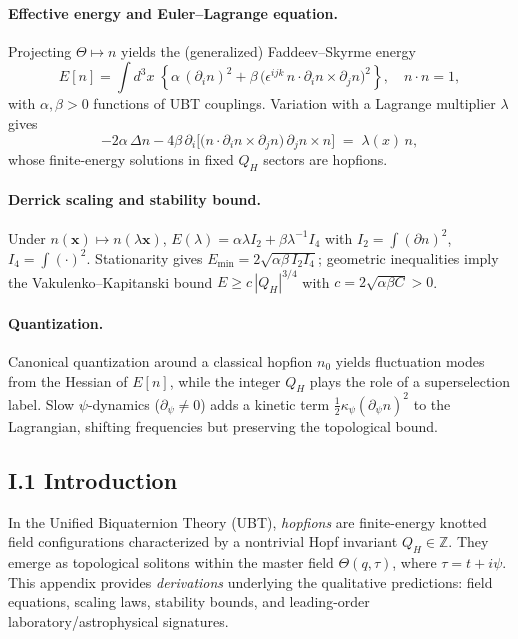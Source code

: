 \paragraph{Effective energy and Euler--Lagrange equation.}
Projecting $\Theta\mapsto n$ yields the (generalized) Faddeev--Skyrme energy
\begin{equation}
E[n]=\int d^3x\;\left\{\alpha\,(\partial_i n)^2+\beta\,\big(\epsilon^{ijk}\,n\cdot\partial_i n\times\partial_j n\big)^2\right\},\quad n\cdot n=1,
\end{equation}
with $\alpha,\beta>0$ functions of UBT couplings.
Variation with a Lagrange multiplier $\lambda$ gives
\begin{equation}
-2\alpha\,\Delta n -4\beta\,\partial_i\Big[\big(n\cdot\partial_i n\times\partial_j n\big)\,\partial_j n\times n\Big] \;=\; \lambda(x)\, n,
\end{equation}
whose finite-energy solutions in fixed $Q_H$ sectors are hopfions.

\paragraph{Derrick scaling and stability bound.}
Under $n(\mathbf{x})\mapsto n(\lambda\mathbf{x})$, $E(\lambda)=\alpha\lambda I_2+\beta\lambda^{-1}I_4$ with $I_2=\int(\partial n)^2$, $I_4=\int(\cdot)^2$.
Stationarity gives $E_{\min}=2\sqrt{\alpha\beta\,I_2 I_4}$; geometric inequalities imply the Vakulenko--Kapitanski bound $E\ge c\,|Q_H|^{3/4}$ with $c=2\sqrt{\alpha\beta C}>0$.

\paragraph{Quantization.}
Canonical quantization around a classical hopfion $n_0$ yields fluctuation modes from the Hessian of $E[n]$, while the integer $Q_H$ plays the role of a superselection label.
Slow $\psi$-dynamics ($\partial_\psi\neq 0$) adds a kinetic term $\frac12\kappa_\psi(\partial_\psi n)^2$ to the Lagrangian, shifting frequencies but preserving the topological bound.

\subsection*{I.1 Introduction}
In the Unified Biquaternion Theory (UBT), \emph{hopfions} are finite-energy knotted field configurations characterized by a nontrivial Hopf invariant $Q_H\in\mathbb{Z}$. 
They emerge as topological solitons within the master field $\Theta(q,\tau)$, where $\tau=t+i\psi$. 
This appendix provides \emph{derivations} underlying the qualitative predictions: field equations, scaling laws, stability bounds, and leading-order laboratory/astrophysical signatures.

